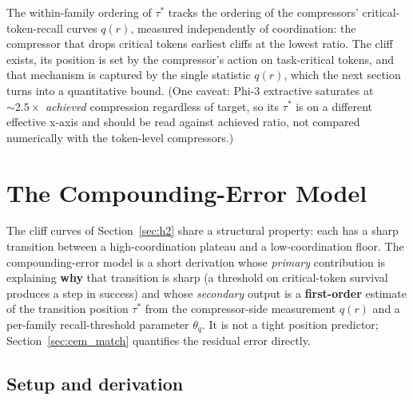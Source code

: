 The within-family ordering of $\tau^{*}$ tracks the ordering of the
compressors' critical-token-recall curves $q(r)$, measured
independently of coordination: the compressor that drops critical
tokens earliest cliffs at the lowest ratio. The cliff exists, its
position is set by the compressor's action on task-critical tokens,
and that mechanism is captured by the single statistic $q(r)$, which
the next section turns into a quantitative bound. (One caveat: Phi-3
extractive saturates at $\sim2.5\times$ \emph{achieved} compression
regardless of target, so its $\tau^{*}$ is on a different effective
x-axis and should be read against achieved ratio, not compared
numerically with the token-level compressors.)

\section{The Compounding-Error Model}
\label{sec:cem}

The cliff curves of Section~\ref{sec:h2} share a structural
property: each has a sharp transition between a high-coordination
plateau and a low-coordination floor. The compounding-error model
is a short derivation whose \emph{primary} contribution is
explaining \textbf{why} that transition is sharp (a threshold
on critical-token survival produces a step in success) and
whose \emph{secondary} output is a \textbf{first-order} estimate
of the transition position $\tau^{*}$ from the compressor-side
measurement $q(r)$ and a per-family recall-threshold parameter
$\theta_q$. It is not a tight position predictor; Section~\ref{sec:cem_match} quantifies the residual
error directly.

\subsection{Setup and derivation}

